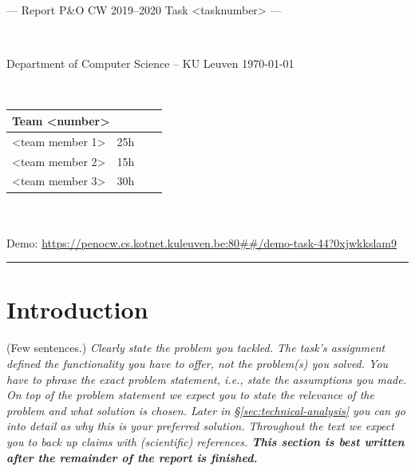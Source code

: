 \documentclass[a4paper,11pt]{article}
\newcommand{\note}[1]{{\colorbox{yellow!40!white}{#1}}}
\newcommand{\exampletext}[1]{{\color{blue!60!black}#1}}
\begin{document}
\noindent
\colorbox[HTML]{52BDEC}{\bfseries\parbox{\textwidth}{\centering\large
  --- Report P\&O CW 2019--2020 Task <tasknumber> ---
}}
\\[-1mm]
\colorbox[HTML]{00407A}{\bfseries\color{white}\parbox{\textwidth}{
  Department of Computer Science -- KU Leuven
  \hfill
  \today
}}
\\

\smallskip

\noindent
\begin{tabular}{*4l}
\toprule
\multicolumn{2}{l}{\large\textbf{Team <number>}} \\
\midrule
<team member 1> & 25h \\ %
<team member 2> & 15h \\
<team member 3> & 30h \\
\bottomrule
\hline
\end{tabular}\\
\\
Demo: \url{https://penocw.cs.kotnet.kuleuven.be:80##/demo-task-44?0xjwkkslam9}

\noindent
{\color[HTML]{52BDEC} \rule{\linewidth}{1mm} }

\section{Introduction}\label{sec:introduction}

\note{(Few sentences.)}
\exampletext{
\textit{Clearly state the problem you tackled. The task's assignment defined the functionality you have to offer, not the problem(s) you solved. You have to phrase the exact problem statement, i.e., state the assumptions you made. On top of the problem statement we expect you to state the relevance of the problem and what solution is chosen. Later in \S\ref{sec:technical-analysis} you can go into detail as why this is your preferred solution. Throughout the text we expect you to back up claims with (scientific) references.
\textbf{This section is best written after the remainder of the report is finished.}}}
\end{document}
